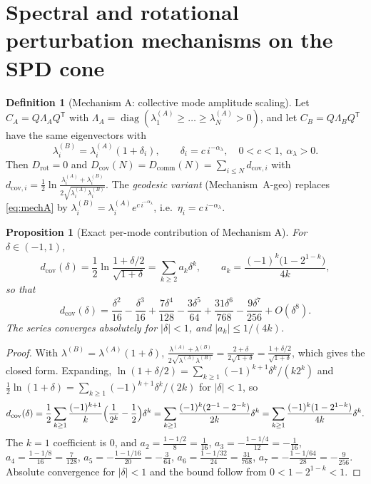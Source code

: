 \documentclass[11pt,reqno]{amsart}
\theoremstyle{plain}
\newtheorem{proposition}[theorem]{Proposition}
\theoremstyle{definition}
\newtheorem{definition}[theorem]{Definition}
\theoremstyle{remark}
\numberwithin{equation}{section}
\DeclareMathOperator{\diag}{diag}
\newcommand{\Dcov}{D_{\mathrm{cov}}}
\newcommand{\Dcomm}{D_{\mathrm{comm}}}
\newcommand{\Drot}{D_{\mathrm{rot}}}
\newcommand{\CA}{C_A}
\newcommand{\CB}{C_B}
\begin{document}
\section{Spectral and rotational perturbation mechanisms on the SPD cone}
\label{sec:mechanisms}

\begin{definition}[Mechanism A: collective mode amplitude scaling]\label{def:A}
Let $\CA=Q\Lambda_AQ^{\mathsf T}$ with $\Lambda_A=\diag(\lambda^{(A)}_1\ge\dots\ge\lambda^{(A)}_N>0)$, and let $\CB=Q\Lambda_BQ^{\mathsf T}$ have the same eigenvectors with
\begin{equation}\label{eq:mechA}
\lambda^{(B)}_i=\lambda^{(A)}_i(1+\delta_i),\qquad \delta_i=c\,i^{-\alpha_\lambda},\quad 0<c<1,\ \alpha_\lambda>0 .
\end{equation}
Then $\Drot=0$ and $\Dcov(N)=\Dcomm(N)=\sum_{i\le N}d_{\mathrm{cov},i}$ with $d_{\mathrm{cov},i}=\tfrac12\ln\frac{\lambda^{(A)}_i+\lambda^{(B)}_i}{2\sqrt{\lambda^{(A)}_i\lambda^{(B)}_i}}$. The \emph{geodesic variant} (Mechanism~A-geo) replaces \eqref{eq:mechA} by $\lambda^{(B)}_i=\lambda^{(A)}_ie^{c\,i^{-\alpha_\lambda}}$, i.e.\ $\eta_i=c\,i^{-\alpha_\lambda}$.
\end{definition}

\begin{proposition}[Exact per-mode contribution of Mechanism A]\label{prop:A}
For $\delta\in(-1,1)$,
\begin{equation}\label{eq:dA}
d_{\mathrm{cov}}(\delta)=\frac12\ln\frac{1+\delta/2}{\sqrt{1+\delta}}=\sum_{k\ge2}a_k\delta^k,\qquad a_k=\frac{(-1)^k\bigl(1-2^{1-k}\bigr)}{4k},
\end{equation}
so that
\begin{equation}\label{eq:dAexp}
d_{\mathrm{cov}}(\delta)=\frac{\delta^2}{16}-\frac{\delta^3}{16}+\frac{7\delta^4}{128}-\frac{3\delta^5}{64}+\frac{31\delta^6}{768}-\frac{9\delta^7}{256}+O(\delta^8).
\end{equation}
The series converges absolutely for $|\delta|<1$, and $|a_k|\le1/(4k)$.
\end{proposition}

\begin{proof}
With $\lambda^{(B)}=\lambda^{(A)}(1+\delta)$, $\frac{\lambda^{(A)}+\lambda^{(B)}}{2\sqrt{\lambda^{(A)}\lambda^{(B)}}}=\frac{2+\delta}{2\sqrt{1+\delta}}=\frac{1+\delta/2}{\sqrt{1+\delta}}$, which gives the closed form. Expanding, $\ln(1+\delta/2)=\sum_{k\ge1}(-1)^{k+1}\delta^k/(k2^k)$ and $\tfrac12\ln(1+\delta)=\sum_{k\ge1}(-1)^{k+1}\delta^k/(2k)$ for $|\delta|<1$, so
\[
d_{\mathrm{cov}}(\delta)=\frac12\sum_{k\ge1}\frac{(-1)^{k+1}}{k}\Bigl(\frac1{2^k}-\frac12\Bigr)\delta^k=\sum_{k\ge1}\frac{(-1)^k(2^{-1}-2^{-k})}{2k}\delta^k=\sum_{k\ge1}\frac{(-1)^k(1-2^{1-k})}{4k}\delta^k .
\]
The $k=1$ coefficient is $0$, and $a_2=\frac{1-1/2}{8}=\frac1{16}$, $a_3=-\frac{1-1/4}{12}=-\frac1{16}$, $a_4=\frac{1-1/8}{16}=\frac7{128}$, $a_5=-\frac{1-1/16}{20}=-\frac3{64}$, $a_6=\frac{1-1/32}{24}=\frac{31}{768}$, $a_7=-\frac{1-1/64}{28}=-\frac9{256}$. Absolute convergence for $|\delta|<1$ and the bound follow from $0<1-2^{1-k}<1$.
\end{proof}
\end{document}
